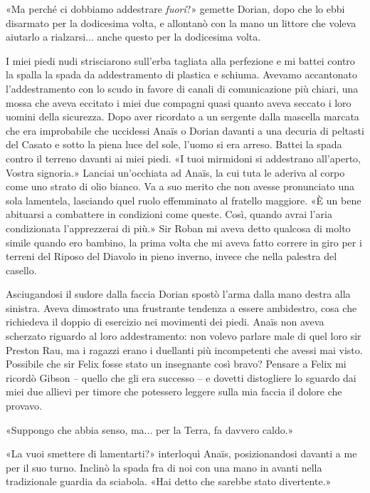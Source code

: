 «Ma perché ci dobbiamo addestrare \emph{fuori}?» gemette Dorian, dopo
che lo ebbi disarmato per la dodicesima volta, e allontanò con la mano
un littore che voleva aiutarlo a rialzarsi... anche questo per la
dodicesima volta.

I miei piedi nudi strisciarono sull'erba tagliata alla perfezione e mi
battei contro la spalla la spada da addestramento di plastica e schiuma.
Avevamo accantonato l'addestramento con lo scudo in favore di canali di
comunicazione più chiari, una mossa che aveva eccitato i miei due
compagni quasi quanto aveva seccato i loro uomini della sicurezza. Dopo
aver ricordato a un sergente dalla mascella marcata che era improbabile
che uccidessi Anaïs o Dorian davanti a una decuria di peltasti del
Casato e sotto la piena luce del sole, l'uomo si era arreso. Battei la
spada contro il terreno davanti ai miei piedi. «I tuoi mirmidoni si
addestrano all'aperto, Vostra signoria.» Lanciai un'occhiata ad Anaïs,
la cui tuta le aderiva al corpo come uno strato di olio bianco. Va a suo
merito che non avesse pronunciato una sola lamentela, lasciando quel
ruolo effemminato al fratello maggiore. «È un bene abituarsi a
combattere in condizioni come queste. Così, quando avrai l'aria
condizionata l'apprezzerai di più.» Sir Roban mi aveva detto qualcosa di
molto simile quando ero bambino, la prima volta che mi aveva fatto
correre in giro per i terreni del Riposo del Diavolo in pieno inverno,
invece che nella palestra del casello.

Asciugandosi il sudore dalla faccia Dorian spostò l'arma dalla mano
destra alla sinistra. Aveva dimostrato una frustrante tendenza a essere
ambidestro, cosa che richiedeva il doppio di esercizio nei movimenti dei
piedi. Anaïs non aveva scherzato riguardo al loro addestramento: non
volevo parlare male di quel loro sir Preston Rau, ma i ragazzi erano i
duellanti più incompetenti che avessi mai visto. Possibile che sir Felix
fosse stato un insegnante così bravo? Pensare a Felix mi ricordò Gibson
-- quello che gli era successo -- e dovetti distogliere lo sguardo dai
miei due allievi per timore che potessero leggere sulla mia faccia il
dolore che provavo.

«Suppongo che abbia senso, ma... per la Terra, fa davvero caldo.»

«La vuoi smettere di lamentarti?» interloquì Anaïs, posizionandosi
davanti a me per il suo turno. Inclinò la spada fra di noi con una mano
in avanti nella tradizionale guardia da sciabola. «Hai detto che sarebbe
stato divertente.»

